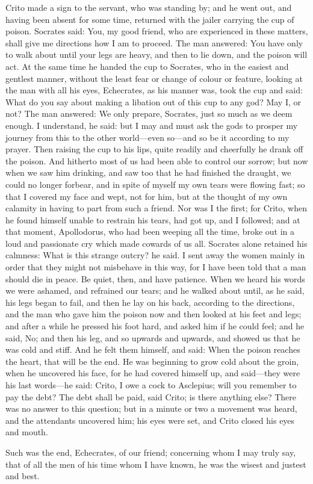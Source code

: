 Crito made a sign to the servant, who was standing by; and he went out,
and having been absent for some time, returned with the jailer carrying
the cup of poison. Socrates said: You, my good friend, who are experienced
in these matters, shall give me directions how I am to proceed. The man
answered: You have only to walk about until your legs are heavy, and then
to lie down, and the poison will act. At the same time he handed the cup
to Socrates, who in the easiest and gentlest manner, without the least
fear or change of colour or feature, looking at the man with all his eyes,
Echecrates, as his manner was, took the cup and said: What do you say
about making a libation out of this cup to any god? May I, or not? The man
answered: We only prepare, Socrates, just so much as we deem enough. I
understand, he said: but I may and must ask the gods to prosper my journey
from this to the other world—even so—and so be it according to
my prayer. Then raising the cup to his lips, quite readily and cheerfully
he drank off the poison. And hitherto most of us had been able to control
our sorrow; but now when we saw him drinking, and saw too that he had
finished the draught, we could no longer forbear, and in spite of myself
my own tears were flowing fast; so that I covered my face and wept, not
for him, but at the thought of my own calamity in having to part from such
a friend. Nor was I the first; for Crito, when he found himself unable to
restrain his tears, had got up, and I followed; and at that moment,
Apollodorus, who had been weeping all the time, broke out in a loud and
passionate cry which made cowards of us all. Socrates alone retained his
calmness: What is this strange outcry? he said. I sent away the women
mainly in order that they might not misbehave in this way, for I have been
told that a man should die in peace. Be quiet, then, and have patience.
When we heard his words we were ashamed, and refrained our tears; and he
walked about until, as he said, his legs began to fail, and then he lay on
his back, according to the directions, and the man who gave him the poison
now and then looked at his feet and legs; and after a while he pressed his
foot hard, and asked him if he could feel; and he said, No; and then his
leg, and so upwards and upwards, and showed us that he was cold and stiff.
And he felt them himself, and said: When the poison reaches the heart,
that will be the end. He was beginning to grow cold about the groin, when
he uncovered his face, for he had covered himself up, and said—they
were his last words—he said: Crito, I owe a cock to Asclepius; will
you remember to pay the debt? The debt shall be paid, said Crito; is there
anything else? There was no answer to this question; but in a minute or
two a movement was heard, and the attendants uncovered him; his eyes were
set, and Crito closed his eyes and mouth.

Such was the end, Echecrates, of our friend; concerning whom I may truly
say, that of all the men of his time whom I have known, he was the wisest
and justest and best.
